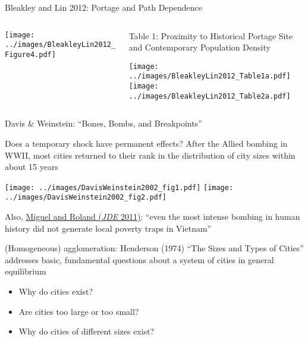 \documentclass[11pt,notes=hide,aspectratio=169]{beamer}
\begin{document}
\begin{frame}{Bleakley and Lin 2012: Portage and Path Dependence}
\begin{columns}
\begin{column}{.45\textwidth}
\texttt{[image: ../images/BleakleyLin2012\_Figure4.pdf]}
\end{column}
\begin{column}{.40\textwidth}
{\tiny Table 1: Proximity to Historical Portage Site and Contemporary Population Density\par}
\texttt{[image: ../images/BleakleyLin2012\_Table1a.pdf]} \\
\texttt{[image: ../images/BleakleyLin2012\_Table2a.pdf]}
\end{column}
\end{columns}
\end{frame}
\begin{frame}{Davis \& Weinstein: ``Bones, Bombs, and Breakpoints''}
{\small Does a temporary shock have permanent effects? After the Allied bombing in WWII, most cities returned to their rank in the distribution of city sizes within about 15 years \par}
\texttt{[image: ../images/DavisWeinstein2002\_fig1.pdf]}
\texttt{[image: ../images/DavisWeinstein2002\_fig2.pdf]}\\
{Also, \href{https://www.sciencedirect.com/science/article/pii/S0304387810000817}{Miguel and Roland (\textit{JDE} 2011)}: ``even the most intense bombing in human history did not generate local poverty traps in Vietnam''\par}
\end{frame}
\begin{frame}{(Homogeneous) agglomeration: Henderson (1974)}
``The Sizes and Types of Cities'' addresses basic, fundamental questions about a system of cities in general equilibrium
\begin{itemize}
\item Why do cities exist? 
\item Are cities too large or too small?
\item Why do cities of different sizes exist?
\end{itemize}
\end{frame}
\end{document}
